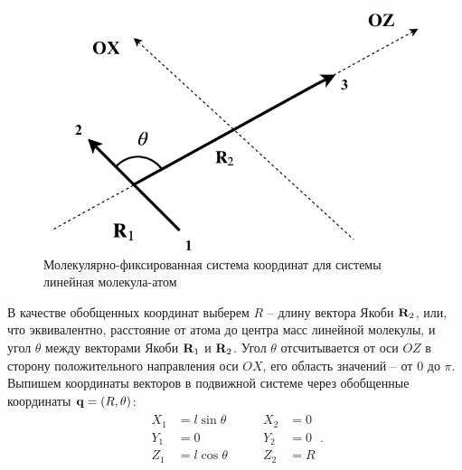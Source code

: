 \begin{figure}[H]
    \centering
    \includegraphics[width=0.5\linewidth]{pictures/triatom_coordinates.pdf}
    \caption{Молекулярно-фиксированная система координат для системы линейная молекула-атом}
    \label{fig:body-fixed-linear-atom}
\end{figure}

В качестве обобщенных координат выберем $R$ -- длину вектора Якоби $\mathbf{R}_2$, или, что эквивалентно, расстояние от атома до центра масс линейной молекулы, и угол $\theta$ между векторами Якоби $\mathbf{R}_1$ и $\mathbf{R}_2$. Угол $\theta$ отсчитывается от оси $OZ$ в сторону положительного направления оси $OX$, его область значений -- от $0$ до $\pi$. Выпишем координаты векторов в подвижной системе через обобщенные координаты $\mathbf{q} = \left( R, \theta \right)$: 
\begin{gather}
    \begin{aligned}
        X_1 &= l \sin \theta \\
        Y_1 &= 0 \\
        Z_1 &= l \cos \theta
    \end{aligned} \qquad
    \begin{aligned}
        X_2 &= 0 \\ 
        Y_2 &= 0 \\
        Z_2 &= R 
    \end{aligned}. \label{linear-molecule-atom-jacobi-coords}
\end{gather}

